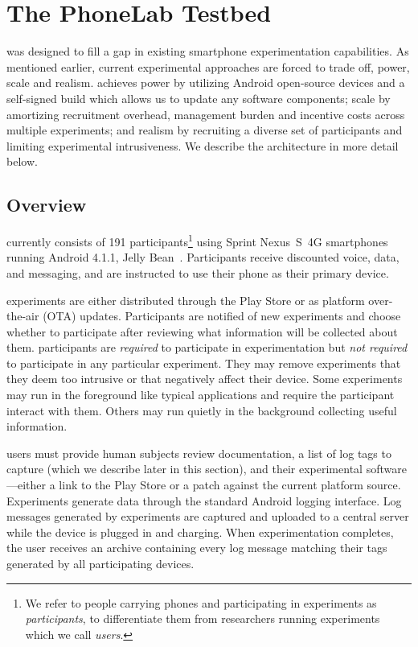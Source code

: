 \section{The PhoneLab Testbed}
\label{sec-testbed}

\PhoneLab{} was designed to fill a gap in existing smartphone experimentation
capabilities. As mentioned earlier, current experimental approaches are
forced to trade off, power, scale and realism. \PhoneLab{} achieves power by
utilizing Android open-source devices and a self-signed build which allows us
to update any software components; scale by amortizing recruitment overhead,
management burden and incentive costs across multiple experiments; and
realism by recruiting a diverse set of participants and limiting experimental
intrusiveness. We describe the architecture \PhoneLab{} in more detail below.

\subsection{Overview}

\PhoneLab{} currently consists of 191 participants\footnote{We refer to
people carrying \PhoneLab{} phones and participating in experiments as
\PhoneLab{} \textit{participants}, to differentiate them from researchers
running \PhoneLab{} experiments which we call \textit{users}.} using Sprint
Nexus~S~4G smartphones~\cite{nexuss4g} running Android 4.1.1, Jelly
Bean~\cite{jellybean}. Participants receive discounted voice, data, and
messaging, and are instructed to use their \PhoneLab{} phone as their primary
device.

\PhoneLab{} experiments are either distributed through the Play Store or as
platform over-the-air (OTA) updates. Participants are notified of new
experiments and choose whether to participate after reviewing what
information will be collected about them. \PhoneLab{} participants are
\textit{required} to participate in experimentation but \textit{not required}
to participate in any particular experiment. They may remove experiments
that they deem too intrusive or that negatively affect their device. Some
experiments may run in the foreground like typical applications and require
the participant interact with them. Others may run quietly in the background
collecting useful information. 

\PhoneLab{} users must provide human subjects review documentation, a list of
log tags to capture (which we describe later in this section), and their
experimental software---either a link to the Play Store or a patch against
the current \PhoneLab{} platform source.  Experiments generate data through
the standard Android logging interface. Log messages generated by \PhoneLab{}
experiments are captured and uploaded to a central server while the device is
plugged in and charging. When experimentation completes, the user receives an
archive containing every log message matching their tags generated by all
participating devices.

